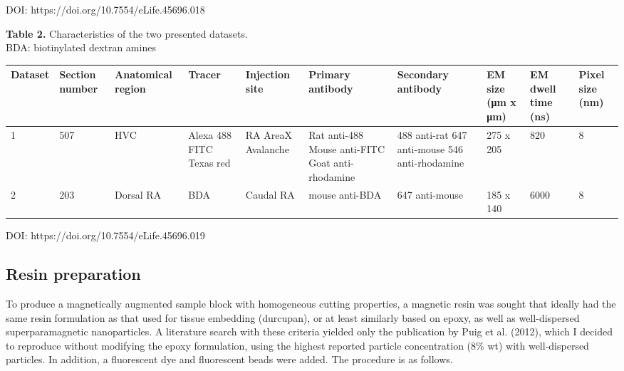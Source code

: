 \documentclass{article}
\begin{document}
\noindent DOI: https://doi.org/10.7554/eLife.45696.018

\medskip
\noindent\textbf{Table 2.} Characteristics of the two presented datasets.\\
BDA: biotinylated dextran amines\par\nopagebreak
{\small\noindent\begin{tabular}{@{}p{0.9cm}p{1.0cm}p{1.2cm}p{1.3cm}p{1.2cm}p{1.9cm}p{1.6cm}p{1.2cm}p{1.1cm}p{0.8cm}@{}}
\toprule
\textbf{Dataset} & \textbf{Section number} & \textbf{Anatomical region} & \textbf{Tracer} & \textbf{Injection site} & \textbf{Primary antibody} & \textbf{Secondary antibody} & \textbf{EM size (μm x μm)} & \textbf{EM dwell time (ns)} & \textbf{Pixel size (nm)} \\
\midrule
1 & 507 & HVC & Alexa 488 FITC Texas red & RA AreaX Avalanche & Rat anti-488 Mouse anti-FITC Goat anti-rhodamine & 488 anti-rat 647 anti-mouse 546 anti-rhodamine & 275 x 205 & 820 & 8 \\
\midrule
2 & 203 & Dorsal RA & BDA & Caudal RA & mouse anti-BDA & 647 anti-mouse & 185 x 140 & 6000 & 8 \\
\bottomrule
\end{tabular}}

\noindent DOI: https://doi.org/10.7554/eLife.45696.019

\subsection*{Resin preparation}

To produce a magnetically augmented sample block with homogeneous cutting properties, a magnetic resin was sought that ideally had the same resin formulation as that used for tissue embedding (durcupan), or at least similarly based on epoxy, as well as well-dispersed superparamagnetic nanoparticles. A literature search with these criteria yielded only the publication by Puig et al. (2012), which I decided to reproduce without modifying the epoxy formulation, using the highest reported particle concentration (8\% wt) with well-dispersed particles. In addition, a fluorescent dye and fluorescent beads were added. The procedure is as follows.
\end{document}
